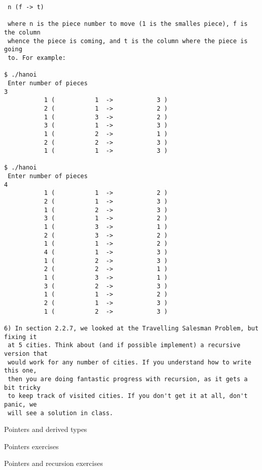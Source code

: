 \begin{verbatim}
 n (f -> t)

 where n is the piece number to move (1 is the smalles piece), f is the column
 whence the piece is coming, and t is the column where the piece is going
 to. For example:

$ ./hanoi
 Enter number of pieces
3
           1 (           1  ->            3 )
           2 (           1  ->            2 )
           1 (           3  ->            2 )
           3 (           1  ->            3 )
           1 (           2  ->            1 )
           2 (           2  ->            3 )
           1 (           1  ->            3 )

$ ./hanoi
 Enter number of pieces
4
           1 (           1  ->            2 )
           2 (           1  ->            3 )
           1 (           2  ->            3 )
           3 (           1  ->            2 )
           1 (           3  ->            1 )
           2 (           3  ->            2 )
           1 (           1  ->            2 )
           4 (           1  ->            3 )
           1 (           2  ->            3 )
           2 (           2  ->            1 )
           1 (           3  ->            1 )
           3 (           2  ->            3 )
           1 (           1  ->            2 )
           2 (           1  ->            3 )
           1 (           2  ->            3 )

6) In section 2.2.7, we looked at the Travelling Salesman Problem, but fixing it
 at 5 cities. Think about (and if possible implement) a recursive version that
 would work for any number of cities. If you understand how to write this one,
 then you are doing fantastic progress with recursion, as it gets a bit tricky
 to keep track of visited cities. If you don't get it at all, don't panic, we
 will see a solution in class.
\end{verbatim}


 {Pointers and derived types}
{}

 {Pointers exercises}
\label{sec:pointers-exercises}

 {Pointers and recursion exercises}
\label{sec:pointers-recursion-exercises}



